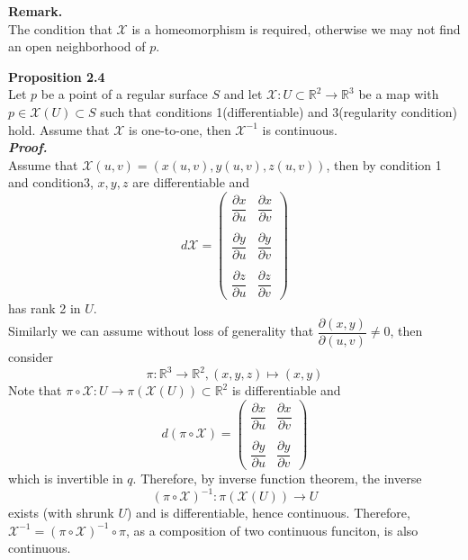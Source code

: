 \documentclass{article}
\begin{document}
\par
\textbf{Remark.}\\
The condition that $\mathcal{X}$ is a homeomorphism is required, otherwise we may not find an open neighborhood of $p$.

\par
\textbf{Proposition 2.4}\\
Let $p$ be a point of a regular surface $S$ and let $\mathcal{X}: U \subset \mathbb{R}^2 \to \mathbb{R}^3$ be a map with $p \in \mathcal{X}(U) \subset S$
such that conditions 1(differentiable) and 3(regularity condition) hold. Assume that $\mathcal{X}$ is one-to-one, then $\mathcal{X}^{-1}$ is continuous.\\
\textbf{\textit{Proof.}}\\
Assume that $\mathcal{X}(u,v)=(x(u,v),y(u,v),z(u,v))$, then by condition 1 and condition3, $x, y, z$ are differentiable and
$$
    d\mathcal{X} = 
    \left(
        \begin{array}{cc}
            \dfrac{\partial x}{\partial u} & \dfrac{\partial x}{\partial v}\\\\
            \dfrac{\partial y}{\partial u} & \dfrac{\partial y}{\partial v}\\\\
            \dfrac{\partial z}{\partial u} & \dfrac{\partial z}{\partial v}
        \end{array}
    \right)
$$
has rank 2 in $U$.\\
Similarly we can assume without loss of generality that $\dfrac{\partial(x,y)}{\partial(u,v)} \neq 0$, then consider 
$$
    \pi: \mathbb{R}^3 \to \mathbb{R}^2, (x,y,z) \mapsto (x,y)
$$
Note that $\pi \circ \mathcal{X}: U \to \pi(\mathcal{X}(U)) \subset \mathbb{R}^2$ is differentiable and
$$
    d(\pi \circ \mathcal{X}) = 
    \left(
        \begin{array}{cc}
            \dfrac{\partial x}{\partial u} & \dfrac{\partial x}{\partial v}\\\\
            \dfrac{\partial y}{\partial u} & \dfrac{\partial y}{\partial v}
        \end{array}
    \right)
$$
which is invertible in $q$. Therefore, by inverse function theorem, the inverse
$$
    (\pi \circ \mathcal{X})^{-1}: \pi(\mathcal{X}(U)) \to U
$$
exists (with shrunk $U$) and is differentiable, hence continuous.
Therefore, $\mathcal{X}^{-1} = (\pi \circ \mathcal{X})^{-1} \circ \pi$, as a composition of two
continuous funciton, is also continuous. \qedsymbol
\end{document}

